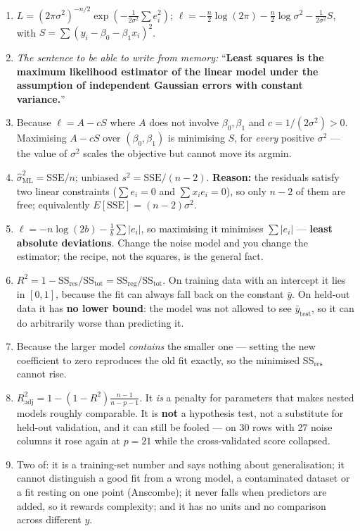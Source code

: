 \documentclass[11pt,a4paper]{article}
\newcommand{\A}[1]{\item[\textbf{#1}]}
\begin{document}
\begin{enumerate}[leftmargin=1.9cm]
\A{U5.19} $L = (2\pi\sigma^2)^{-n/2}\exp\!\left(-\frac{1}{2\sigma^2}\sum e_i^2
\right)$;
$\ell = -\frac n2\log(2\pi) - \frac n2\log\sigma^2 - \frac{1}{2\sigma^2}S$,
with $S = \sum(y_i - \beta_0 - \beta_1x_i)^2$.

\A{U5.20} \emph{The sentence to be able to write from memory:}
``\textbf{Least squares is the maximum likelihood estimator of the linear model
under the assumption of independent Gaussian errors with constant
variance.}''

\A{U5.21} Because $\ell = A - cS$ where $A$ does not involve $\beta_0,\beta_1$
and $c = 1/(2\sigma^2) > 0$. Maximising $A - cS$ over $(\beta_0,\beta_1)$ is
minimising $S$, for \emph{every} positive $\sigma^2$ --- the value of $\sigma^2$
scales the objective but cannot move its argmin.

\A{U5.22} $\hat\sigma^2_{\text{ML}} = \text{SSE}/n$; unbiased
$s^2 = \text{SSE}/(n-2)$. \textbf{Reason:} the residuals satisfy two linear
constraints ($\sum e_i = 0$ and $\sum x_ie_i = 0$), so only $n-2$ of them are
free; equivalently $E[\text{SSE}] = (n-2)\sigma^2$.

\A{U5.23} $\ell = -n\log(2b) - \frac1b\sum|e_i|$, so maximising it minimises
$\sum|e_i|$ --- \textbf{least absolute deviations}. Change the noise model and
you change the estimator; the recipe, not the squares, is the general fact.

\A{U5.24} $R^2 = 1 - \text{SS}_{\text{res}}/\text{SS}_{\text{tot}} =
\text{SS}_{\text{reg}}/\text{SS}_{\text{tot}}$. On training data with an
intercept it lies in $[0,1]$, because the fit can always fall back on the
constant $\bar y$. On held-out data it has \textbf{no lower bound}: the model
was not allowed to see $\bar y_{\text{test}}$, so it can do arbitrarily worse
than predicting it.

\A{U5.25} Because the larger model \emph{contains} the smaller one --- setting
the new coefficient to zero reproduces the old fit exactly, so the minimised
SS$_{\text{res}}$ cannot rise.

\A{U5.26} $R^2_{\text{adj}} = 1 - (1-R^2)\frac{n-1}{n-p-1}$. It \emph{is} a
penalty for parameters that makes nested models roughly comparable. It is
\textbf{not} a hypothesis test, not a substitute for held-out validation, and
it can still be fooled --- on 30 rows with 27 noise columns it rose again at
$p = 21$ while the cross-validated score collapsed.

\A{U5.27} Two of: it is a training-set number and says nothing about
generalisation; it cannot distinguish a good fit from a wrong model, a
contaminated dataset or a fit resting on one point (Anscombe); it never falls
when predictors are added, so it rewards complexity; and it has no units and no
comparison across different $y$.


\end{enumerate}
\end{document}
